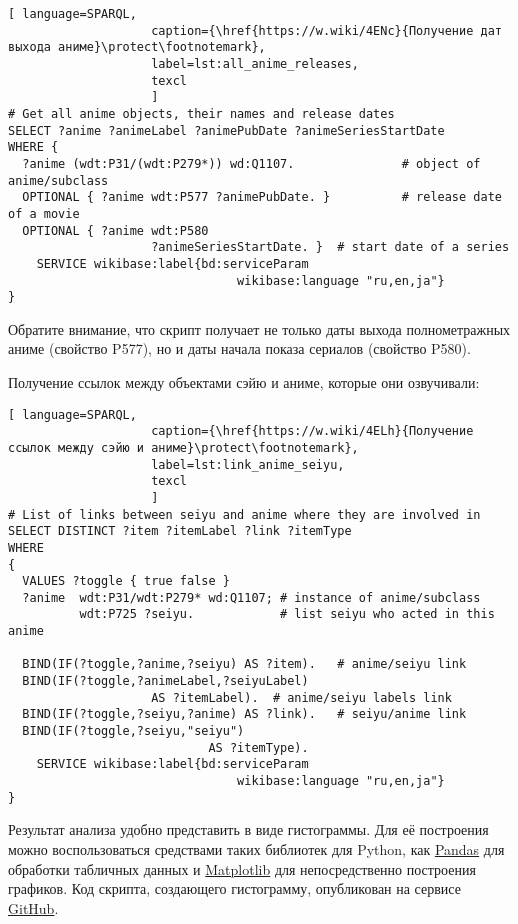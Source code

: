 \begin{lstlisting}[ language=SPARQL, 
                    caption={\href{https://w.wiki/4ENc}{Получение дат выхода аниме}\protect\footnotemark},
                    label=lst:all_anime_releases,
                    texcl 
                    ]
# Get all anime objects, their names and release dates
SELECT ?anime ?animeLabel ?animePubDate ?animeSeriesStartDate
WHERE {
  ?anime (wdt:P31/(wdt:P279*)) wd:Q1107.               # object of anime/subclass
  OPTIONAL { ?anime wdt:P577 ?animePubDate. }          # release date of a movie
  OPTIONAL { ?anime wdt:P580
					?animeSeriesStartDate. }  # start date of a series
    SERVICE wikibase:label{bd:serviceParam
					     		wikibase:language "ru,en,ja"}
}
\end{lstlisting}%

Обратите внимание, что скрипт получает не только даты выхода полнометражных аниме (свойство P577), но и даты начала показа сериалов (свойство P580). 

Получение ссылок между объектами сэйю и аниме, которые они озвучивали: 

\begin{lstlisting}[ language=SPARQL, 
                    caption={\href{https://w.wiki/4ELh}{Получение ссылок между сэйю и аниме}\protect\footnotemark},
                    label=lst:link_anime_seiyu,
                    texcl 
                    ]
# List of links between seiyu and anime where they are involved in
SELECT DISTINCT ?item ?itemLabel ?link ?itemType
WHERE
{
  VALUES ?toggle { true false }
  ?anime  wdt:P31/wdt:P279* wd:Q1107; # instance of anime/subclass
          wdt:P725 ?seiyu.            # list seiyu who acted in this anime
  
  BIND(IF(?toggle,?anime,?seiyu) AS ?item).   # anime/seiyu link
  BIND(IF(?toggle,?animeLabel,?seiyuLabel)
					AS ?itemLabel).  # anime/seiyu labels link
  BIND(IF(?toggle,?seiyu,?anime) AS ?link).   # seiyu/anime link
  BIND(IF(?toggle,?seiyu,"seiyu")
							AS ?itemType).
    SERVICE wikibase:label{bd:serviceParam
					     		wikibase:language "ru,en,ja"}
}
\end{lstlisting}%

Результат анализа удобно представить в виде гистограммы. Для её построения можно воспользоваться средствами таких библиотек для Python, как \href{https://ru.wikipedia.org/wiki/Pandas}{Pandas} для обработки табличных данных и \href{https://ru.wikipedia.org/wiki/Matplotlib}{Matplotlib} для непосредственно построения графиков. Код скрипта, создающего гистограмму, опубликован на сервисе \href{https://github.com/componavt/wd_book/blob/master/programming_tasks/seiyu_age/age_act_hist.ipynb}{GitHub}.

